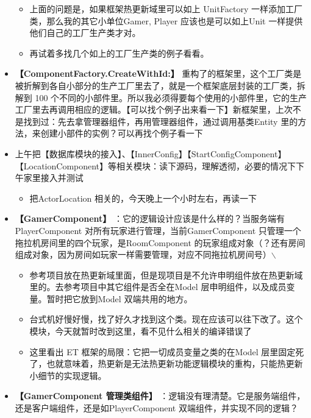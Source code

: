 \documentclass[9pt, b5paper]{article}
\begin{document}
\begin{itemize}
\begin{itemize}
\item 上面的问题是，如果框架热更新域里可以如上 UnitFactory 一样添加工厂类，那么我的其它小单位Gamer, Player 应该也是可以如上Unit 一样提供他们自己的工厂生产类才对。
\item 再试着多找几个如上的工厂生产类的例子看看。
\end{itemize}
\item \textbf{【ComponentFactory.CreateWithId:】} 重构了的框架里，这个工厂类是被折解到各自小部分的生产工厂里去了，就是一个框架底层封装的工厂类，拆解到 100 个不同的小部件里。所以我必须得要每个使用的小部件里，它的生产工厂里去再调用相应的逻辑。【可以找个例子出来看一下】新框架里，上次不是找到过：先去拿管理器组件，再用管理器组件，通过调用基类Entity 里的方法，来创建小部件的实例？可以再找个例子看一下
\item 上午把【数据库模块的接入】、【InnerConfig】【StartConfigComponent】【LocationComponent】等相关模块：读下源码，理解透彻，必要的情况下下午家里接入并测试
\begin{itemize}
\item 把ActorLocation 相关的，今天晚上一个小时左右，再读一下
\end{itemize}
\item \textbf{【GamerComponent】} ：它的逻辑设计应该是什么样的？当服务端有 PlayerComponent 对所有玩家进行管理，当前GamerComponent 只管理一个拖拉机房间里的四个玩家，是RoomComponent 的玩家组成对象（？还有房间组成对象，因为房间如玩家一样需要管理，对应不同拖拉机房间号）$\backslash$
\begin{itemize}
\item 参考项目放在热更新域里面，但是现项目是不允许申明组件放在热更新域里的。去参考项目中其它组件是否全在Model 层申明组件，以及成员变量。暂时把它放到Model 双端共用的地方。
\item 台式机好慢好慢，找了好久才找到这个类。现在应该可以往下改了。这个模块，今天就暂时改到这里，看不见什么相关的编译错误了
\item 这里看出 ET 框架的局限：它把一切成员变量之类的在Model 层里固定死了，也就意味着，热更新是无法热更新功能逻辑模块的重构，只能热更新小细节的实现逻辑。
\end{itemize}
\item \textbf{【GamerComponent 管理类组件】} ：逻辑没有理清楚。它是服务端组件，还是客户端组件，还是如PlayerComponent 双端组件，并实现不同的逻辑？
\end{itemize}
\end{document}
